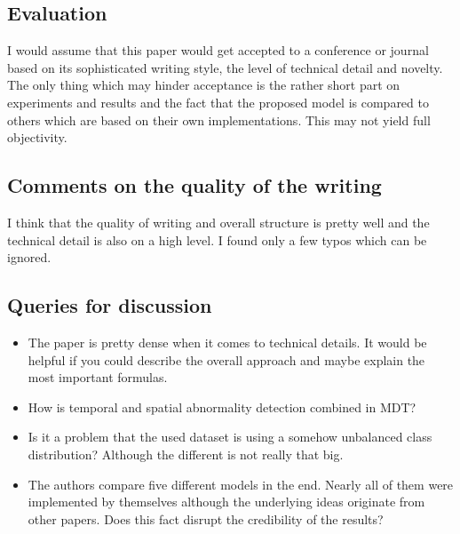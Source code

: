 \documentclass[a4paper]{article}
\begin{document}
\subsection{Evaluation}

I would assume that this paper would get accepted to a conference or journal based on its sophisticated writing style, the level of technical detail and novelty. The only thing which may hinder acceptance is the rather short part on experiments and results and the fact that the proposed model is compared to others which are based on their own implementations. This may not yield full objectivity.

\subsection{Comments on the quality of the writing}

I think that the quality of writing and overall structure is pretty well and the technical detail is also on a high level. I found only a few typos which can be ignored.

\subsection{Queries for discussion}

\begin{itemize}
	\item The paper is pretty dense when it comes to technical details. It would be helpful if you could describe the overall approach and maybe explain the most important formulas. 
	\item How is temporal and spatial abnormality detection combined in MDT?
	\item Is it a problem that the used dataset is using a somehow unbalanced class distribution? Although the different is not really that big.
	\item The authors compare five different models in the end. Nearly all of them were implemented by themselves although the underlying ideas originate from other papers. Does this fact disrupt the credibility of the results?
\end{itemize}
\end{document}
